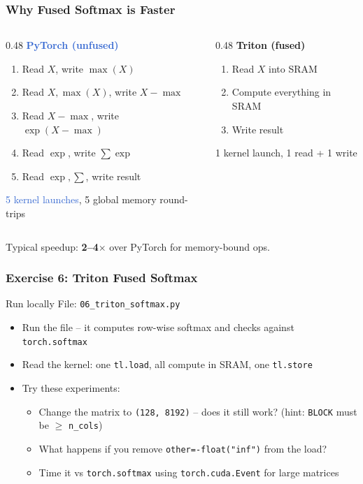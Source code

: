 \documentclass[aspectratio=169]{beamer}
\begin{document}
\begin{frame}
	\frametitle{Why Fused Softmax is Faster}
	\begin{columns}
		\begin{column}{0.48\textwidth}
			\textbf{\textcolor{highlight}{PyTorch (unfused)}}
			\begin{enumerate}
				\item Read $X$, write $\max(X)$
				\item Read $X, \max(X)$, write $X - \max$
				\item Read $X{-}\max$, write $\exp(X{-}\max)$
				\item Read $\exp$, write $\sum \exp$
				\item Read $\exp, \sum$, write result
			\end{enumerate}
			\textcolor{highlight}{5 kernel launches}, 5 global memory round-trips
		\end{column}
		\begin{column}{0.48\textwidth}
			\textbf{\textcolor{codegreen}{Triton (fused)}}
			\begin{enumerate}
				\item Read $X$ into SRAM
				\item Compute everything in SRAM
				\item Write result
			\end{enumerate}
			\vspace{2.1em}
			\textcolor{codegreen}{1 kernel launch}, 1 read + 1 write
		\end{column}
	\end{columns}
	\vspace{1em}
	Typical speedup: \textbf{2--4$\times$} over PyTorch for memory-bound ops.
\end{frame}

\begin{frame}
	\frametitle{Exercise 6: Triton Fused Softmax}
	\begin{block}{Run locally}
		File: \texttt{06\_triton\_softmax.py}
	\end{block}
	\vspace{0.5em}
	\begin{itemize}
		\item Run the file -- it computes row-wise softmax and checks against \texttt{torch.softmax}
		\item Read the kernel: one \texttt{tl.load}, all compute in SRAM, one \texttt{tl.store}
		\item Try these experiments:
		      \begin{itemize}
			      \item Change the matrix to \texttt{(128, 8192)} -- does it still work? (hint: \texttt{BLOCK} must be $\geq$ \texttt{n\_cols})
			      \item What happens if you remove \texttt{other=-float("inf")} from the load?
			      \item Time it vs \texttt{torch.softmax} using \texttt{torch.cuda.Event} for large matrices
		      \end{itemize}
	\end{itemize}
\end{frame}
\end{document}
